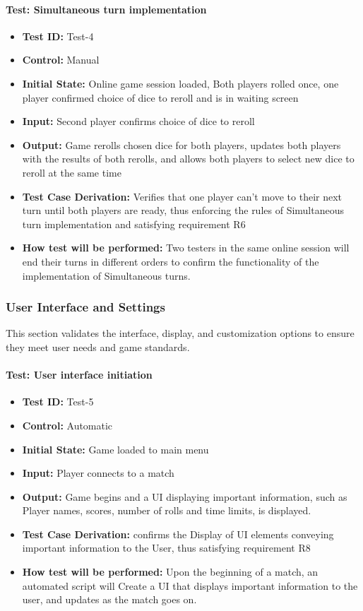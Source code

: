 \documentclass[12pt, titlepage]{article}
\begin{document}
\paragraph{Test: Simultaneous turn implementation}
\begin{itemize}
    \item \textbf{Test ID:} Test-4
    \item \textbf{Control:} Manual
    \item \textbf{Initial State:} Online game session loaded, Both players rolled once, one player confirmed choice of dice to reroll and is in waiting screen
    \item \textbf{Input:} Second player confirms choice of dice to reroll 
    \item \textbf{Output:} Game rerolls chosen dice for both players, updates both players with the results of both rerolls, and allows both players to select new dice to reroll at the same time
    \item \textbf{Test Case Derivation:} Verifies that one player can’t move to their next turn until both players are ready, thus enforcing the rules of Simultaneous turn implementation and satisfying requirement R6
    \item \textbf{How test will be performed:} Two testers in the same online session will end their turns in different orders to confirm the functionality of the implementation of Simultaneous turns.
\end{itemize}

\subsubsection{User Interface and Settings}

This section validates the interface, display, and customization options to ensure they meet user needs and game standards.

\paragraph{Test: User interface initiation}
\begin{itemize}
    \item \textbf{Test ID:} Test-5
    \item \textbf{Control:} Automatic
    \item \textbf{Initial State:} Game loaded to main menu
    \item \textbf{Input:} Player connects to a match
    \item \textbf{Output:} Game begins and a UI displaying important information, such as Player names, scores, number of rolls and time limits, is displayed.
    \item \textbf{Test Case Derivation:} confirms the Display of UI elements conveying important information to the User, thus satisfying requirement R8
    \item \textbf{How test will be performed:} Upon the beginning of a match, an automated script will Create a UI that displays important information to the user, and updates as the match goes on.
\end{itemize}
\end{document}
